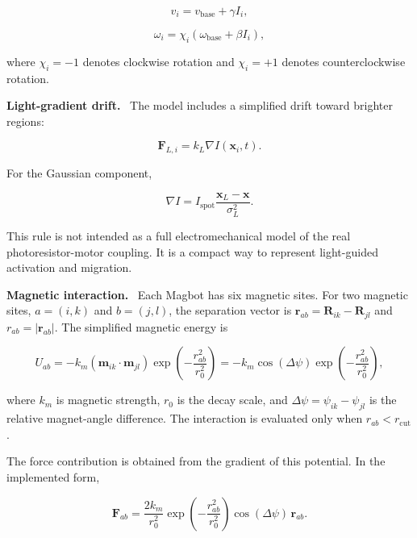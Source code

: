 \documentclass[12pt,a4paper,oneside]{report}
\newcommand{\runin}[1]{\vspace{0.45em}\noindent\textbf{#1.}\ }
\begin{document}
\begin{equation}
v_i = v_{\mathrm{base}} + \gamma I_i,
\end{equation}

\begin{equation}
\omega_i = \chi_i\left(\omega_{\mathrm{base}} + \beta I_i\right),
\end{equation}

where $\chi_i=-1$ denotes clockwise rotation and $\chi_i=+1$ denotes counterclockwise rotation.

\runin{Light-gradient drift}
The model includes a simplified drift toward brighter regions:

\begin{equation}
\mathbf{F}_{L,i} = k_L \nabla I(\mathbf{x}_i,t).
\end{equation}

For the Gaussian component,

\begin{equation}
\nabla I =
I_{\mathrm{spot}}
\frac{\mathbf{x}_L-\mathbf{x}}{\sigma_L^2}.
\end{equation}

This rule is not intended as a full electromechanical model of the real photoresistor-motor coupling. It is a compact way to represent light-guided activation and migration.

\runin{Magnetic interaction}
Each Magbot has six magnetic sites. For two magnetic sites, $a=(i,k)$ and $b=(j,l)$, the separation vector is $\mathbf{r}_{ab}=\mathbf{R}_{ik}-\mathbf{R}_{jl}$ and $r_{ab}=|\mathbf{r}_{ab}|$. The simplified magnetic energy is

\begin{equation}
U_{ab} =
-k_m
\left(\mathbf{m}_{ik}\cdot\mathbf{m}_{jl}\right)
\exp\left(-\frac{r_{ab}^2}{r_0^2}\right)
=
-k_m \cos(\Delta\psi)
\exp\left(-\frac{r_{ab}^2}{r_0^2}\right),
\end{equation}

where $k_m$ is magnetic strength, $r_0$ is the decay scale, and $\Delta\psi=\psi_{ik}-\psi_{jl}$ is the relative magnet-angle difference. The interaction is evaluated only when $r_{ab}<r_{\mathrm{cut}}$.

The force contribution is obtained from the gradient of this potential. In the implemented form,

\begin{equation}
\mathbf{F}_{ab} =
\frac{2k_m}{r_0^2}
\exp\left(-\frac{r_{ab}^2}{r_0^2}\right)
\cos(\Delta\psi)\,\mathbf{r}_{ab}.
\end{equation}
\end{document}
